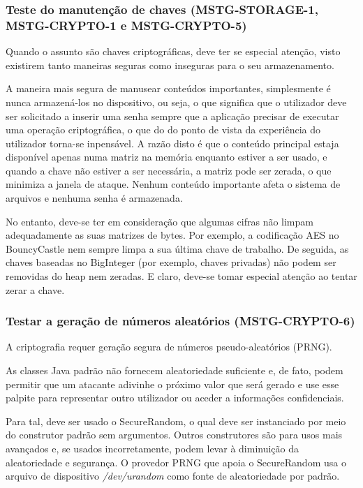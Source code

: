 \subsubsection{Teste do manutenção de chaves (MSTG-STORAGE-1, MSTG-CRYPTO-1 e MSTG-CRYPTO-5)}
\par Quando o assunto são chaves criptográficas, deve ter se especial atenção, visto existirem tanto maneiras seguras como inseguras para o seu armazenamento. 
\par A maneira mais segura de manusear conteúdos importantes, simplesmente é nunca armazená-los no dispositivo, ou seja, o que significa que o utilizador deve ser solicitado a inserir uma senha sempre que a aplicação precisar de executar uma operação criptográfica, o que do do ponto de vista da experiência do utilizador torna-se inpensável. A razão disto é que o conteúdo principal estaja disponível apenas numa matriz na memória enquanto estiver a ser usado, e quando a chave não estiver a ser necessária, a matriz pode ser zerada, o que minimiza a janela de ataque. Nenhum conteúdo importante afeta o sistema de arquivos e nenhuma senha é armazenada. 

\par No entanto, deve-se ter em consideração que algumas cifras não limpam adequadamente as suas matrizes de bytes. Por exemplo, a codificação AES no BouncyCastle nem sempre limpa a sua última chave de trabalho. De seguida, as chaves baseadas no BigInteger (por exemplo, chaves privadas) não podem ser removidas do heap nem zeradas. E claro, deve-se tomar especial atenção ao tentar zerar a chave. 



\subsubsection{Testar a geração de números aleatórios (MSTG-CRYPTO-6)}
\par A criptografia requer geração segura de números pseudo-aleatórios (PRNG).
\par As classes Java padrão não fornecem aleatoriedade suficiente e, de fato, podem permitir que um atacante adivinhe o próximo valor que será gerado e use esse palpite para representar outro utilizador ou aceder a informações confidenciais.

\par Para tal, deve ser usado o SecureRandom, o qual deve ser instanciado por meio do construtor padrão sem argumentos. Outros construtores são para usos mais avançados e, se usados incorretamente, podem levar à diminuição da aleatoriedade e segurança. O provedor PRNG que apoia o SecureRandom usa o arquivo de dispositivo \textit{/dev/urandom} como fonte de aleatoriedade por padrão.






